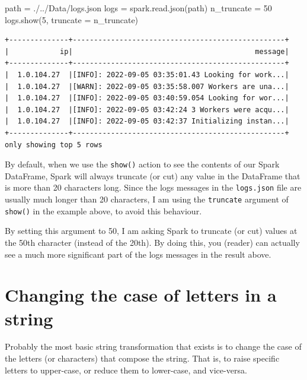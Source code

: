 \documentclass[
  11pt,
  letterpaper,
  DIV=11,
  numbers=noendperiod]{scrreprt}
\newenvironment{Shaded}{\begin{snugshade}}{\end{snugshade}}
\newcommand{\DecValTok}[1]{\textcolor[rgb]{0.68,0.00,0.00}{#1}}
\newcommand{\NormalTok}[1]{\textcolor[rgb]{0.00,0.23,0.31}{#1}}
\newcommand{\OperatorTok}[1]{\textcolor[rgb]{0.37,0.37,0.37}{#1}}
\newcommand{\StringTok}[1]{\textcolor[rgb]{0.13,0.47,0.30}{#1}}
\begin{document}
\begin{Shaded}
\begin{Highlighting}[]
\NormalTok{path }\OperatorTok{=} \StringTok{\textquotesingle{}./../Data/logs.json\textquotesingle{}}
\NormalTok{logs }\OperatorTok{=}\NormalTok{ spark.read.json(path)}
\NormalTok{n\_truncate }\OperatorTok{=} \DecValTok{50}
\NormalTok{logs.show(}\DecValTok{5}\NormalTok{, truncate }\OperatorTok{=}\NormalTok{ n\_truncate)}
\end{Highlighting}
\end{Shaded}

\begin{verbatim}
+--------------+--------------------------------------------------+
|            ip|                                           message|
+--------------+--------------------------------------------------+
|  1.0.104.27  |[INFO]: 2022-09-05 03:35:01.43 Looking for work...|
|  1.0.104.27  |[WARN]: 2022-09-05 03:35:58.007 Workers are una...|
|  1.0.104.27  |[INFO]: 2022-09-05 03:40:59.054 Looking for wor...|
|  1.0.104.27  |[INFO]: 2022-09-05 03:42:24 3 Workers were acqu...|
|  1.0.104.27  |[INFO]: 2022-09-05 03:42:37 Initializing instan...|
+--------------+--------------------------------------------------+
only showing top 5 rows
\end{verbatim}

By default, when we use the \texttt{show()} action to see the contents
of our Spark DataFrame, Spark will always truncate (or cut) any value in
the DataFrame that is more than 20 characters long. Since the logs
messages in the \texttt{logs.json} file are usually much longer than 20
characters, I am using the \texttt{truncate} argument of \texttt{show()}
in the example above, to avoid this behaviour.

By setting this argument to 50, I am asking Spark to truncate (or cut)
values at the 50th character (instead of the 20th). By doing this, you
(reader) can actually see a much more significant part of the logs
messages in the result above.

\hypertarget{changing-the-case-of-letters-in-a-string}{%
\section{Changing the case of letters in a
string}\label{changing-the-case-of-letters-in-a-string}}

Probably the most basic string transformation that exists is to change
the case of the letters (or characters) that compose the string. That
is, to raise specific letters to upper-case, or reduce them to
lower-case, and vice-versa.
\end{document}

